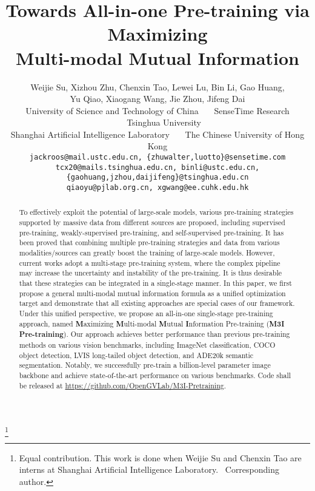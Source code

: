 \documentclass[10pt,twocolumn,letterpaper]{article}
\def\name{M3I Pre-training}
\newcommand\blfootnote[1]{\begingroup
\renewcommand\thefootnote{}\footnote{#1}\addtocounter{footnote}{-1}\endgroup
}
\begin{document}
\title{Towards All-in-one Pre-training via Maximizing \\ Multi-modal Mutual Information}


\author{
  Weijie Su,
  Xizhou Zhu\textsuperscript{\Letter},
  Chenxin Tao,
  Lewei Lu,
  Bin Li,
  Gao Huang,\\
  Yu Qiao, 
  Xiaogang Wang,
  Jie Zhou,
  Jifeng Dai\\
University of Science and Technology of China \ \ \
SenseTime Research \ \ \
Tsinghua University\\  
Shanghai Artificial Intelligence Laboratory \ \ \
The Chinese University of Hong Kong\\
{\tt\small jackroos@mail.ustc.edu.cn, \{zhuwalter,luotto\}@sensetime.com}\\
{\tt\small tcx20@mails.tsinghua.edu.cn, binli@ustc.edu.cn, \{gaohuang,jzhou,daijifeng\}@tsinghua.edu.cn}\\
{\tt\small qiaoyu@pjlab.org.cn, xgwang@ee.cuhk.edu.hk}}

\maketitle

\begin{abstract}
  \vspace{-0.5em}
  To effectively exploit the potential of large-scale models, various pre-training strategies supported by massive data from different sources are proposed, including supervised pre-training, weakly-supervised pre-training, and self-supervised pre-training. It has been proved that combining multiple pre-training strategies and data from various modalities/sources can greatly boost the training of large-scale models. However, current works adopt a multi-stage pre-training system, where the complex pipeline may increase the uncertainty and instability of the pre-training. It is thus desirable that these strategies can be integrated in a single-stage manner. In this paper, we first propose a general multi-modal mutual information formula as a unified optimization target and demonstrate that all existing approaches are special cases of our framework. Under this unified perspective, we propose an all-in-one single-stage pre-training approach, named \textbf{M}aximizing \textbf{M}ulti-modal \textbf{M}utual \textbf{I}nformation Pre-training (\textbf{\name{}}). Our approach achieves better performance than previous pre-training methods on various vision benchmarks, including ImageNet classification, COCO object detection, LVIS long-tailed object detection, and ADE20k semantic segmentation. Notably, we successfully pre-train a billion-level parameter image backbone and achieve state-of-the-art performance on various benchmarks. Code shall be released at \url{https://github.com/OpenGVLab/M3I-Pretraining}.
\end{abstract} \blfootnote{ Equal contribution. This work is done when Weijie Su and Chenxin Tao are interns at Shanghai Artificial Intelligence Laboratory. \Letter\ Corresponding author.}
\vspace{-1.5em}
\end{document}

